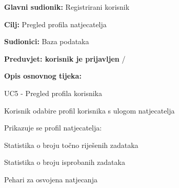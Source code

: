 					
					\noindent {}
					\begin{packed_item}
						
						\item \textbf{Glavni sudionik: }Registrirani korisnik
						\item  \textbf{Cilj:} Pregled profila natjecatelja
						\item  \textbf{Sudionici:} Baza podataka
						\item  \textbf{Preduvjet: korisnik je prijavljen} /
						\item  \textbf{Opis osnovnog tijeka:}
						
						\item[] \begin{packed_enum}
							
							\item UC5 - Pregled profila korisnika
							\item Korisnik odabire profil korisnika s ulogom natjecatelja
							\item Prikazuje se profil natjecatelja:
								\item[] \begin{packed_enum}
								\item Statistika o broju točno riješenih zadataka
								\item Statistika o broju isprobanih zadataka 
								\item Pehari za osvojena natjecanja
								
							\end{packed_enum}
						\end{packed_enum}
					\end{packed_item}
					
										
				
